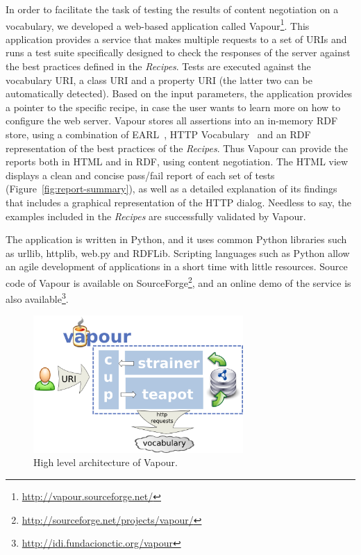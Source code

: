 \documentclass{../templates/llncs}
\begin{document}
In order to facilitate the task of testing the results of content 
negotiation on a vocabulary, we developed a web-based application 
called Vapour\footnote{\url{http://vapour.sourceforge.net/}}. This 
application provides a service that makes multiple requests to a set 
of URIs and runs a test suite specifically designed to check the responses 
of the server against the best practices defined in the \textit{Recipes}.
Tests are executed against the vocabulary
URI, a class URI and a property URI (the latter two can be automatically detected).
Based on the input parameters, the application provides a pointer to the specific
recipe, in case the user wants to learn more on how to configure the web server. 
Vapour stores all assertions into an in-memory RDF store, using a combination of EARL~\cite{EARL}, HTTP
Vocabulary~\cite{Koch2007} and an RDF representation of the best practices of the \textit{Recipes}. 
Thus Vapour can provide the reports both in HTML and in RDF, using content
negotiation. The HTML view displays a clean and concise pass/fail report of each 
set of tests (Figure~\ref{fig:report-summary}), as  well as a detailed explanation 
of its findings that includes a graphical representation of the HTTP dialog. Needless 
to say, the examples included in the \textit{Recipes} are successfully validated by 
Vapour.

The application is written in Python, and it uses common
Python libraries such as urllib, httplib, web.py and RDFLib. Scripting languages such 
as Python allow an agile development of applications in a short time with little 
resources. Source code of Vapour is available on 
SourceForge\footnote{\url{http://sourceforge.net/projects/vapour/}},
and an online demo of the service is also available\footnote{\url{http://idi.fundacionctic.org/vapour}}.

\begin{figure}
 \centering
 \includegraphics[width=8cm]{images/arch.png}
 \caption{\label{fig:arch}High level architecture of Vapour.}
\end{figure}
\end{document}
